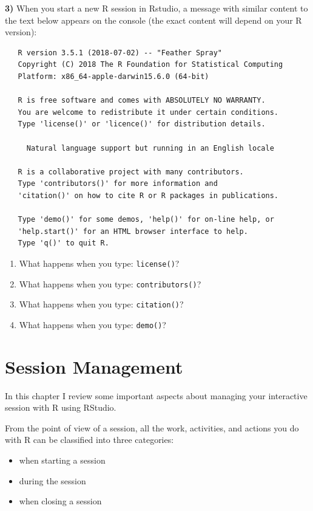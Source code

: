 \documentclass[
]{book}
\begin{document}
\textbf{3)} When you start a new R session in Rstudio, a message with similar content to
the text below appears on the console (the exact content will depend on your
R version):

\begin{verbatim}
   R version 3.5.1 (2018-07-02) -- "Feather Spray"
   Copyright (C) 2018 The R Foundation for Statistical Computing
   Platform: x86_64-apple-darwin15.6.0 (64-bit)

   R is free software and comes with ABSOLUTELY NO WARRANTY.
   You are welcome to redistribute it under certain conditions.
   Type 'license()' or 'licence()' for distribution details.

     Natural language support but running in an English locale   

   R is a collaborative project with many contributors.
   Type 'contributors()' for more information and
   'citation()' on how to cite R or R packages in publications.

   Type 'demo()' for some demos, 'help()' for on-line help, or
   'help.start()' for an HTML browser interface to help.
   Type 'q()' to quit R.
\end{verbatim}

\begin{enumerate}
\def\labelenumi{\alph{enumi})}
\item
  What happens when you type: \texttt{license()}?
\item
  What happens when you type: \texttt{contributors()}?
\item
  What happens when you type: \texttt{citation()}?
\item
  What happens when you type: \texttt{demo()}?
\end{enumerate}

\hypertarget{session}{%
\chapter{Session Management}\label{session}}

In this chapter I review some important aspects about managing your
interactive session with R using RStudio.

From the point of view of a session, all the work, activities, and actions you
do with R can be classified into three categories:

\begin{itemize}
\item
  when starting a session
\item
  during the session
\item
  when closing a session
\end{itemize}
\end{document}
